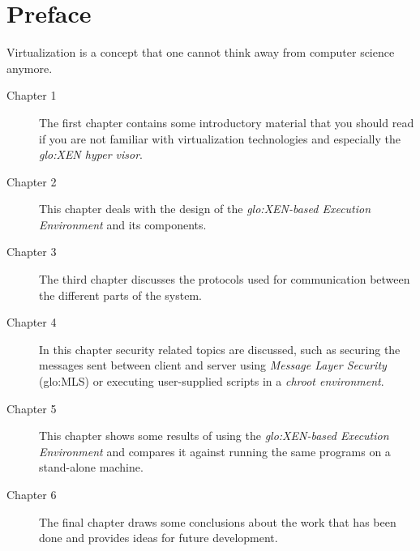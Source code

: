 
\chapter{Preface}
\thispagestyle{empty}

Virtualization  is a  concept that  one  cannot think  away from  computer
science anymore.


\begin{description}
\item[Chapter  1] The  first chapter  contains some  introductory material
  that  you  should read  if  you  are  not familiar  with  virtualization
  technologies and especially the \emph{\gls{glo:XEN} hyper visor}.
\item[Chapter   2]   This  chapter   deals   with   the   design  of   the
  \emph{\gls{glo:XEN}-based Execution Environment} and its components.
\item[Chapter  3]  The third  chapter  discusses  the  protocols used  for
  communication between the different  parts of the system.
\item[Chapter 4]  In this chapter  security related topics  are discussed,
  such  as securing  the messages  sent  between client  and server  using
  \emph{Message Layer Security} (\gls{glo:MLS}) or executing user-supplied
  scripts in a \emph{chroot environment}.
\item[Chapter   5]  This  chapter   shows  some   results  of   using  the
  \emph{\gls{glo:XEN}-based Execution  Environment} and compares  it against running
  the same programs on a stand-alone machine.
\item[Chapter 6] The final chapter draws some conclusions about the work
  that has been done and provides ideas for future development.
\end{description}

\clearpage

